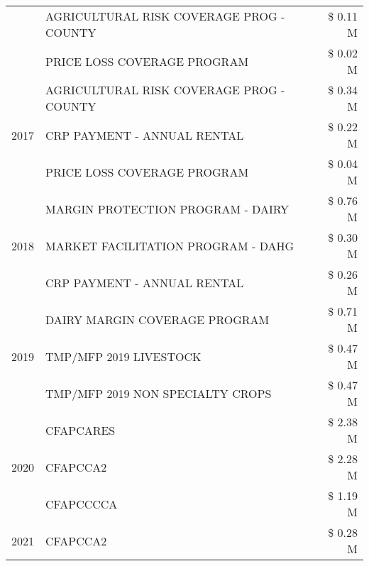\begin{tabular}{llr}
 & AGRICULTURAL RISK COVERAGE PROG - COUNTY & \$ 0.11 M \\
 & PRICE LOSS COVERAGE PROGRAM & \$ 0.02 M \\
\cline{1-3}
\multirow[t]{3}{*}{2017} & AGRICULTURAL RISK COVERAGE PROG - COUNTY & \$ 0.34 M \\
 & CRP PAYMENT - ANNUAL RENTAL & \$ 0.22 M \\
 & PRICE LOSS COVERAGE PROGRAM & \$ 0.04 M \\
\cline{1-3}
\multirow[t]{3}{*}{2018} & MARGIN PROTECTION PROGRAM - DAIRY & \$ 0.76 M \\
 & MARKET FACILITATION PROGRAM - DAHG & \$ 0.30 M \\
 & CRP PAYMENT - ANNUAL RENTAL & \$ 0.26 M \\
\cline{1-3}
\multirow[t]{3}{*}{2019} & DAIRY MARGIN COVERAGE PROGRAM & \$ 0.71 M \\
 & TMP/MFP 2019 LIVESTOCK & \$ 0.47 M \\
 & TMP/MFP 2019 NON SPECIALTY CROPS & \$ 0.47 M \\
\cline{1-3}
\multirow[t]{3}{*}{2020} & CFAPCARES & \$ 2.38 M \\
 & CFAPCCA2 & \$ 2.28 M \\
 & CFAPCCCCA & \$ 1.19 M \\
\cline{1-3}
2021 & CFAPCCA2 & \$ 0.28 M \\
\cline{1-3}
\bottomrule
\end{tabular}

